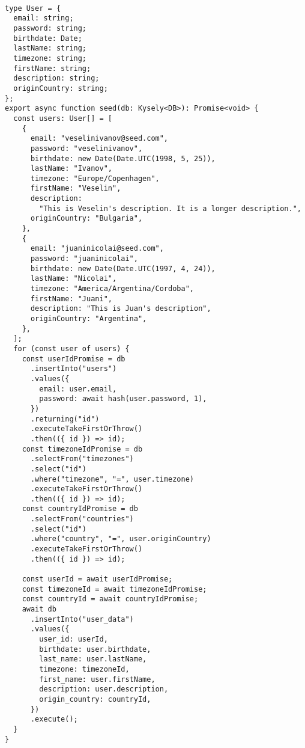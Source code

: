 \begin{verbatim}

type User = {
  email: string;
  password: string;
  birthdate: Date;
  lastName: string;
  timezone: string;
  firstName: string;
  description: string;
  originCountry: string;
};
export async function seed(db: Kysely<DB>): Promise<void> {
  const users: User[] = [
    {
      email: "veselinivanov@seed.com",
      password: "veselinivanov",
      birthdate: new Date(Date.UTC(1998, 5, 25)),
      lastName: "Ivanov",
      timezone: "Europe/Copenhagen",
      firstName: "Veselin",
      description:
        "This is Veselin's description. It is a longer description.",
      originCountry: "Bulgaria",
    },
    {
      email: "juaninicolai@seed.com",
      password: "juaninicolai",
      birthdate: new Date(Date.UTC(1997, 4, 24)),
      lastName: "Nicolai",
      timezone: "America/Argentina/Cordoba",
      firstName: "Juani",
      description: "This is Juan's description",
      originCountry: "Argentina",
    },
  ];
  for (const user of users) {
    const userIdPromise = db
      .insertInto("users")
      .values({
        email: user.email,
        password: await hash(user.password, 1),
      })
      .returning("id")
      .executeTakeFirstOrThrow()
      .then(({ id }) => id);
    const timezoneIdPromise = db
      .selectFrom("timezones")
      .select("id")
      .where("timezone", "=", user.timezone)
      .executeTakeFirstOrThrow()
      .then(({ id }) => id);
    const countryIdPromise = db
      .selectFrom("countries")
      .select("id")
      .where("country", "=", user.originCountry)
      .executeTakeFirstOrThrow()
      .then(({ id }) => id);

    const userId = await userIdPromise;
    const timezoneId = await timezoneIdPromise;
    const countryId = await countryIdPromise;
    await db
      .insertInto("user_data")
      .values({
        user_id: userId,
        birthdate: user.birthdate,
        last_name: user.lastName,
        timezone: timezoneId,
        first_name: user.firstName,
        description: user.description,
        origin_country: countryId,
      })
      .execute();
  }
}
\end{verbatim}